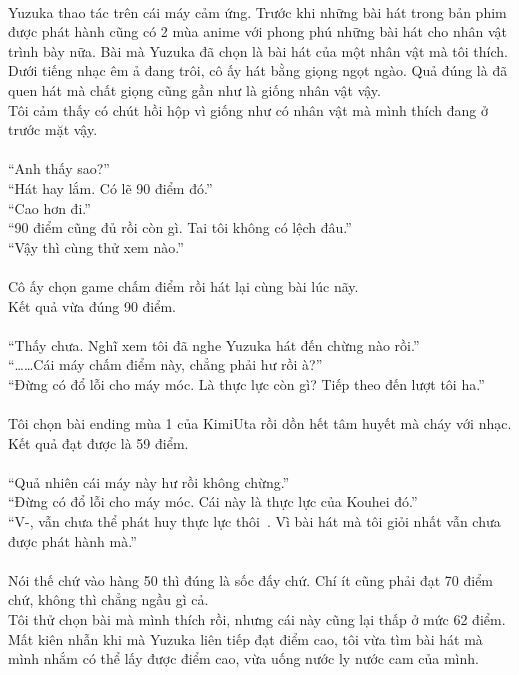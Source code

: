 \documentclass[12pt,a4paper, twosides]{book}
\begin{document}
\\
Yuzuka thao tác trên cái máy cảm ứng. Trước khi những bài hát trong bản phim được phát hành cũng có 2 mùa anime với phong phú những bài hát cho nhân vật trình bày nữa. Bài mà Yuzuka đã chọn là bài hát của một nhân vật mà tôi thích.\\
Dưới tiếng nhạc êm ả đang trôi, cô ấy hát bằng giọng ngọt ngào. Quả đúng là đã quen hát mà chất giọng cũng gần như là giống nhân vật vậy.\\
Tôi cảm thấy có chút hồi hộp vì giống như có nhân vật mà mình thích đang ở trước mặt vậy.\\
\\
“Anh thấy sao?”\\
“Hát hay lắm. Có lẽ 90 điểm đó.”\\
“Cao hơn đi.”\\
“90 điểm cũng đủ rồi còn gì. Tai tôi không có lệch đâu.”\\
“Vậy thì cùng thử xem nào.”\\
\\
Cô ấy chọn game chấm điểm rồi hát lại cùng bài lúc nãy.\\
Kết quả vừa đúng 90 điểm.\\
\\
“Thấy chưa. Nghĩ xem tôi đã nghe Yuzuka hát đến chừng nào rồi.”\\
“……Cái máy chấm điểm này, chẳng phải hư rồi à?”\\
“Đừng có đổ lỗi cho máy móc. Là thực lực còn gì? Tiếp theo đến lượt tôi ha.”\\
\\
Tôi chọn bài ending mùa 1 của KimiUta rồi dồn hết tâm huyết mà cháy với nhạc.\\
Kết quả đạt được là 59 điểm.\\
\\
“Quả nhiên cái máy này hư rồi không chừng.”\\
“Đừng có đổ lỗi cho máy móc. Cái này là thực lực của Kouhei đó.”\\
“V-, vẫn chưa thể phát huy thực lực thôi~. Vì bài hát mà tôi giỏi nhất vẫn chưa được phát hành mà.”\\
\\
Nói thế chứ vào hàng 50 thì đúng là sốc đấy chứ. Chí ít cũng phải đạt 70 điểm chứ, không thì chẳng ngầu gì cả.\\
Tôi thử chọn bài mà mình thích rồi, nhưng cái này cũng lại thấp ở mức 62 điểm. Mất kiên nhẫn khi mà Yuzuka liên tiếp đạt điểm cao, tôi vừa tìm bài hát mà mình nhắm có thể lấy được điểm cao, vừa uống nước ly nước cam của mình.\\
\end{document}
